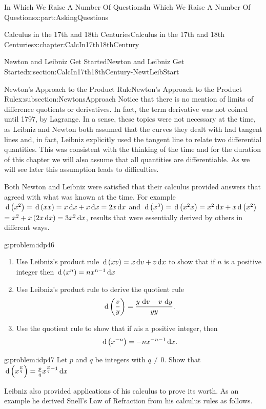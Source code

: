 \documentclass[oneside,10pt,]{book}
\numberwithin{equation}{section}
\newcommand{\dx}[1]{\,{\rm d}#1}
\begin{document}
\begin{partptx}{In Which We Raise A Number Of Questions}{}{In Which We Raise A Number Of Questions}{}{}{x:part:AskingQuestions}
\begin{chapterptx}{Calculus in the 17th and 18th Centuries}{}{Calculus in the 17th and 18th Centuries}{}{}{x:chapter:CalcIn17th18thCentury}
\begin{sectionptx}{Newton and Leibniz Get Started}{}{Newton and Leibniz Get Started}{}{}{x:section:CalcIn17th18thCentury-NewtLeibStart}
\begin{subsectionptx}{Newton's Approach to the Product Rule}{}{Newton's Approach to the Product Rule}{}{}{x:subsection:NewtonsApproach}
 Notice that there is no mention of limits of difference quotients or derivatives.  In fact, the term derivative was not coined until 1797, by Lagrange.  In a sense, these topics were not necessary at the time, as Leibniz and Newton both assumed that the curves they dealt with had tangent lines and, in fact, Leibniz explicitly used the tangent line to relate two differential quantities.  This was consistent with the thinking of the time and for the duration of this chapter we will also assume that all quantities are differentiable.  As we will see later this assumption leads to difficulties.%
\par
Both Newton and Leibniz were satisfied that their calculus provided answers that agreed with what was known at the time.  For example \(\dx{ \left(x^2\right)}=\dx{\left(xx\right)}=x\dx{ x}+x\dx{ x}=2x\dx{ x}\) and \(\dx{\left(x^3\right)}=\dx{\left(x^2x\right)}=x^2\dx{ x}+x\dx{\left(x^2\right)}\) \(=x^2+x\left(2x\dx{ x}\right)=3x^2\dx{ x}\),\(\) results that were essentially derived by others in different ways.%
\begin{problem}{}{g:problem:idp46}%
\begin{enumerate}[font=\bfseries,label=(\alph*),ref=\alph*]
\item{}Use Leibniz's product rule \(\dx{ \left(xv\right)}=x\dx{ v}+v\dx{ x}\) to show that if \(n\) is a positive integer then \(\dx{ \left(x^n\right)}=nx^{n-1}\dx{ x}\)%
\item{}Use Leibniz's product rule to derive the quotient rule%
\begin{equation*}
\dx{ \left(\frac{v}{y}\right)}=\frac{y\,\dx{ v}-v\,\dx{ y}}{yy}\text{.}
\end{equation*}
%
\item{}Use the quotient rule to show that if \(n\)is a positive integer, then%
\begin{equation*}
\dx{ \left(x^{-n}\right)}=-nx^{-n-1}\dx{ x}.
\end{equation*}
%
\end{enumerate}
\end{problem}
\begin{problem}{}{g:problem:idp47}%
 Let \(p\) and \(q\) be integers with \(q\neq 0\). Show that \(\dx{ \left(x^{\frac{p}{q}}\right)}=\frac{p}{q}x^{\frac{p}{q}-1}\dx{ x}\)%
\end{problem}
Leibniz also provided applications of his calculus to prove its worth. As an example he derived Snell's Law of Refraction from his calculus rules as follows.%

\end{subsectionptx}
\end{sectionptx}
\end{chapterptx}
\end{partptx}
\end{document}
